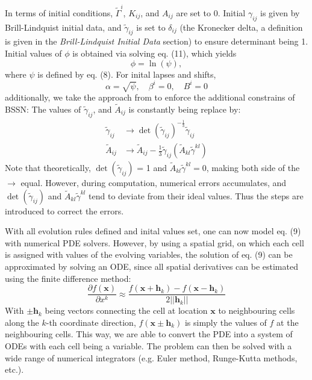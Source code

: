 \documentclass[conference]{IEEEtran}
\begin{document}
In terms of initial conditions, $\tilde{\Gamma}^i$, $K_{ij}$, and $A_{ij}$ are set to 0. Initial $\gamma_{ij}$ 
is given by Brill-Lindquist initial data, and $\tilde{\gamma}_{ij}$ is set to $\delta_{ij}$ 
(the Kronecker delta, a definition is given in the \textit{Brill-Lindquist Initial Data} section)
to ensure determinant being 1. Initial values of $\phi$ is obtained via solving eq. (11), 
which yields
\[
\phi = \ln(\psi),
\]
where $\psi$ is defined by eq. (8). For inital lapses and shifts,
\[\alpha = \sqrt{\psi}, \quad \beta^i = 0, \quad B^i = 0\]
additionally, we take the approach from \cite{cao} to enforce the additional constrains of BSSN: The values of 
$\tilde{\gamma}_{ij}$, and $\tilde{A}_{ij}$ is constantly being replace by:
\begin{align*}
\tilde{\gamma}_{ij} & \rightarrow \det(\tilde{\gamma}_{ij})^{-\frac{1}{3}}\tilde{\gamma}_{ij} \\
\tilde{A}_{ij} & \rightarrow \tilde{A}_{ij} - \frac{1}{3}\tilde{\gamma}_{ij}(\tilde{A}_{kl}\tilde{\gamma}^{kl})
\end{align*}
Note that theoretically, $\det(\tilde{\gamma}_{ij})$ = 1 and $\tilde{A}_{kl}\tilde{\gamma}^{kl} = 0$, 
making both side of the $\rightarrow$ equal. However, during computation, numerical errors accumulates, 
and $\det(\tilde{\gamma}_{ij})$ and $\tilde{A}_{kl}\tilde{\gamma}^{kl}$ tend to deviate 
from their ideal values. Thus the steps are introduced to correct the errors. 

With all evolution rules defined and inital values set, one can now model eq. (9) 
with numerical PDE solvers. However, by using a spatial grid, on which each cell is assigned with 
values of the evolving variables, the solution of eq. (9) can be approximated by solving an ODE, since 
all spatial derivatives can be estimated using the finite difference method:
\[
\frac{\partial f(\mathbf{x})}{\partial x^k} \approx \frac{f(\mathbf{x} + \mathbf{h}_k) - f(\mathbf{x} - \mathbf{h}_k)}
{2||\mathbf{h}_k||}
\]
With $\pm\mathbf{h}_k$ being vectors connecting the cell at location $\mathbf{x}$ to neighbouring cells along the 
$k$-th coordinate direction, $f(\mathbf{x} \pm \mathbf{h}_k)$ is simply the values of $f$ at the neighbouring cells.
This way, we are able to convert the PDE into a system of ODEs with 
each cell being a variable. The problem can then be solved with a 
wide range of numerical integrators (e.g. Euler method, Runge-Kutta methods, etc.).
\end{document}
